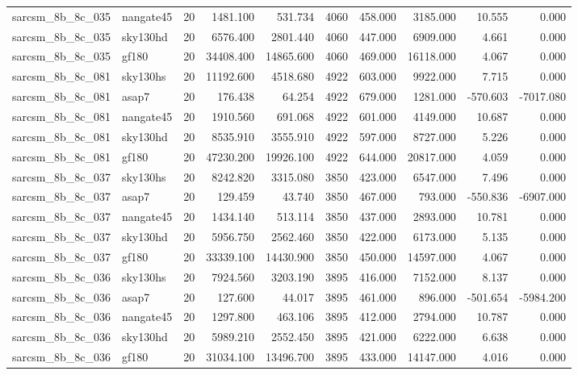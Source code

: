 \begin{longtable}{llrrrrrrrr}
sarcsm\_8b\_8c\_035 & nangate45 & 20 & 1481.100 & 531.734 & 4060 & 458.000 & 3185.000 & 10.555 & 0.000 \\
sarcsm\_8b\_8c\_035 & sky130hd & 20 & 6576.400 & 2801.440 & 4060 & 447.000 & 6909.000 & 4.661 & 0.000 \\
sarcsm\_8b\_8c\_035 & gf180 & 20 & 34408.400 & 14865.600 & 4060 & 469.000 & 16118.000 & 4.067 & 0.000 \\
sarcsm\_8b\_8c\_081 & sky130hs & 20 & 11192.600 & 4518.680 & 4922 & 603.000 & 9922.000 & 7.715 & 0.000 \\
sarcsm\_8b\_8c\_081 & asap7 & 20 & 176.438 & 64.254 & 4922 & 679.000 & 1281.000 & -570.603 & -7017.080 \\
sarcsm\_8b\_8c\_081 & nangate45 & 20 & 1910.560 & 691.068 & 4922 & 601.000 & 4149.000 & 10.687 & 0.000 \\
sarcsm\_8b\_8c\_081 & sky130hd & 20 & 8535.910 & 3555.910 & 4922 & 597.000 & 8727.000 & 5.226 & 0.000 \\
sarcsm\_8b\_8c\_081 & gf180 & 20 & 47230.200 & 19926.100 & 4922 & 644.000 & 20817.000 & 4.059 & 0.000 \\
sarcsm\_8b\_8c\_037 & sky130hs & 20 & 8242.820 & 3315.080 & 3850 & 423.000 & 6547.000 & 7.496 & 0.000 \\
sarcsm\_8b\_8c\_037 & asap7 & 20 & 129.459 & 43.740 & 3850 & 467.000 & 793.000 & -550.836 & -6907.000 \\
sarcsm\_8b\_8c\_037 & nangate45 & 20 & 1434.140 & 513.114 & 3850 & 437.000 & 2893.000 & 10.781 & 0.000 \\
sarcsm\_8b\_8c\_037 & sky130hd & 20 & 5956.750 & 2562.460 & 3850 & 422.000 & 6173.000 & 5.135 & 0.000 \\
sarcsm\_8b\_8c\_037 & gf180 & 20 & 33339.100 & 14430.900 & 3850 & 450.000 & 14597.000 & 4.067 & 0.000 \\
sarcsm\_8b\_8c\_036 & sky130hs & 20 & 7924.560 & 3203.190 & 3895 & 416.000 & 7152.000 & 8.137 & 0.000 \\
sarcsm\_8b\_8c\_036 & asap7 & 20 & 127.600 & 44.017 & 3895 & 461.000 & 896.000 & -501.654 & -5984.200 \\
sarcsm\_8b\_8c\_036 & nangate45 & 20 & 1297.800 & 463.106 & 3895 & 412.000 & 2794.000 & 10.787 & 0.000 \\
sarcsm\_8b\_8c\_036 & sky130hd & 20 & 5989.210 & 2552.450 & 3895 & 421.000 & 6222.000 & 6.638 & 0.000 \\
sarcsm\_8b\_8c\_036 & gf180 & 20 & 31034.100 & 13496.700 & 3895 & 433.000 & 14147.000 & 4.016 & 0.000 \\

\end{longtable}
